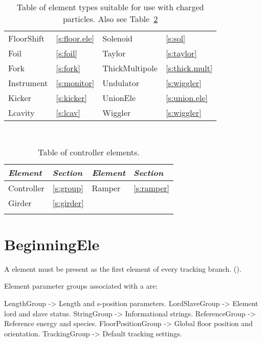 \begin{table}[htb]
{\begin{tabular}{llll}
  FloorShift       & \ref{s:floor.ele}     &  Solenoid          & \ref{s:sol}         \\
  Foil             & \ref{s:foil}          &  Taylor            & \ref{s:taylor}      \\
  Fork             & \ref{s:fork}          &  ThickMultipole    & \ref{s:thick.mult}  \\
  Instrument       & \ref{s:monitor}       &  Undulator         & \ref{s:wiggler}     \\
  Kicker           & \ref{s:kicker}        &  UnionEle          & \ref{s:union.ele}   \\
  Lcavity          & \ref{s:lcav}          &  Wiggler           & \ref{s:wiggler}     \\
  \bottomrule
\end{tabular}
} 
\caption{Table of element types suitable for use with charged particles. Also see
Table~\ref{t:control.classes}} 
\label{t:particle.classes}
\end{table}

\begin{table}[ht]
\centering
{\tt
\begin{tabular}{llll} \toprule
  {\it Element}  & {\it Section}     & {\it Element}  & {\it Section}    \\ \midrule
  Controller     & \ref{s:group}     &  Ramper        & \ref{s:ramper}   \\
  Girder         & \ref{s:girder}    &                &                  \\
 \\ \bottomrule
\end{tabular}
}
\caption{Table of controller elements.}
\label{t:control.classes}
\end{table}

\newpage

\section{BeginningEle}
\label{s:begin.ele}

A  element must be present as the first element of every tracking branch.
().

Element parameter groups associated with a  are:
\begin{example}
  LengthGroup          -> Length and s-position parameters.
  LordSlaveGroup       -> Element lord and slave status.
  StringGroup          -> Informational strings.
  ReferenceGroup       -> Reference energy and species.
  FloorPositionGroup   -> Global floor position and orientation.
  TrackingGroup        -> Default tracking settings.
\end{example}


\newpage

